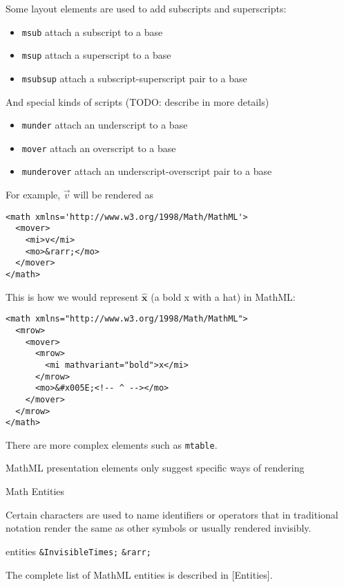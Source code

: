 Some layout elements are used to add subscripts and superscripts:

\begin{itemize}
\itemsep1pt\parskip0pt
\item
  \texttt{msub} attach a subscript to a base
\item
  \texttt{msup} attach a superscript to a base
\item
  \texttt{msubsup} attach a subscript-superscript pair to a base
\end{itemize}

And special kinds of scripts (TODO: describe in more details)

\begin{itemize}
\itemsep1pt\parskip0pt
\item
  \texttt{munder} attach an underscript to a base
\item
  \texttt{mover} attach an overscript to a base
\item
  \texttt{munderover} attach an underscript-overscript pair to a base
\end{itemize}

For example, $\vec v$ will be rendered as

\begin{verbatim}
<math xmlns='http://www.w3.org/1998/Math/MathML'>
  <mover>
    <mi>v</mi>
    <mo>&rarr;</mo>
  </mover>
</math>
\end{verbatim}


This is how we would represent $\hat{ \mathbf x}$ (a bold x with a hat) in MathML:

\begin{verbatim}
<math xmlns="http://www.w3.org/1998/Math/MathML">
  <mrow>
    <mover>
      <mrow>
        <mi mathvariant="bold">x</mi>
      </mrow>
      <mo>&#x005E;<!-- ^ --></mo>
    </mover>
  </mrow>
</math>
\end{verbatim}

There are more complex elements such as \texttt{mtable}.

MathML presentation elements only suggest specific ways of rendering

Math Entities 

Certain characters are used to name identifiers or operators that in
traditional notation render the same as other symbols or usually
rendered invisibly.

entities \texttt{\&InvisibleTimes;} \texttt{\&rarr;}

The complete list of MathML entities is described in [Entities].






